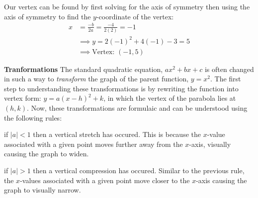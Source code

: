 \documentclass[addpoints]{exam}
\begin{document}
\begin{tcolorbox}[breakable, title=QUADRATIC FUNCTIONS, colframe=black, sharp corners, colback=white, colbacktitle=white, coltitle=black]
    \vspace{0.2in}

    Our vertex can be found by first solving for the axis of symmetry then using the axis of symmetry to find the $y$-coordinate of the vertex: 
      \begin{align*}
        x &= \frac{-b}{2a} = \frac{-4}{2\left(2\right)} = -1 \\ 
        &\implies y = 2\left(-1\right)^2 + 4\left(-1\right) - 3 = 5 \\ 
        &\implies \text{Vertex: } (-1, 5)
      \end{align*}

    \Large \textbf{Tranformations}
    \newline \normalsize 
    The standard quadratic equation, $ax^2+bx+c$ is often changed in such a way to \textit{transform} the graph of the parent function, $y=x^2$. The first step to understanding these transformations is by rewriting the function into vertex form: $y=a\left(x-h\right)^2 + k$, in which the vertex of the parabola lies at $(h, k)$. Now, these transformations are formulaic and can be understood using the following rules:
    \begin{enumerate}
      \begin{minipage}{0.45\linewidth}
        \item if $|a| < 1$ then a vertical stretch has occured. This is because the $x$-value associated with a given point moves further away from the $x$-axis, visually causing the graph to widen.
        \item if $|a| > 1$ then a vertical compression has occured. Similar to the previous rule, the $x$-values associated with a given point move closer to the $x$-axis causing the graph to visually narrow.
      \end{minipage}
      \hfill 
      \begin{minipage}{0.45\linewidth}
\end{minipage}
\end{enumerate}
\end{tcolorbox}
\end{document}
